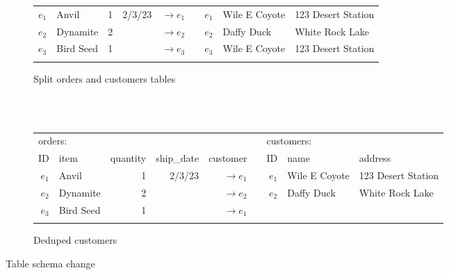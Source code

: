 \documentclass[english,submission]{programming}
\theoremstyle{definition}
\providecommand{\DIFdelbegin}{} %
\providecommand{\DIFaddbeginFL}{} %
\providecommand{\DIFaddendFL}{} %
\begin{document}
\begin{figure}
\begin{subfigure}[b]{40em}
\begin{tabular}{ r|l|r|r|r|cr|l|l|}
     $e_1$ & Anvil & 1 & 2/3/23 & $\rightarrow\!e_1$ && $e_1$ & Wile E Coyote & 123 Desert Station \\
     \hhline{~----~~--}
     $e_2$ & Dynamite & 2 & & $\rightarrow\!e_2$ && $e_2$ & Daffy Duck & White Rock Lake \\
     \hhline{~----~~--}
     $e_3$ & Bird Seed & 1 & & $\rightarrow\!e_3$ && $e_3$ & Wile E Coyote & 123 Desert Station \\
     \hhline{~----~~--}
  \end{tabular}
  \caption{Split orders and customers tables}
  \label{fig:tables-split}
\end{subfigure}
\\[-0.5em]~\\
\begin{subfigure}[b]{40em}\vspace{0pt}
  \sffamily
  \small
  \begin{tabular}{ r|l|r|r|r|cr|l|l|}
  \multicolumn{2}{l}{orders:}&\multicolumn{4}{l}{}&\multicolumn{2}{l}{customers:}\\
     \hhline{~----~~--}
     ID & item & quantity & ship\_date & customer && ID & name & address \\
     \hhline{~====~~==}

     $e_1$ & Anvil & 1 & 2/3/23 & $\rightarrow\!e_1$ && $e_1$ & Wile E Coyote & 123 Desert Station \\
     \hhline{~----~~--}
     $e_2$ & Dynamite & 2 & & $\rightarrow\!e_2$ && $e_2$ & Daffy Duck & White Rock Lake \\
     \hhline{~----~~--}
     $e_3$ & Bird Seed & 1 & & $\rightarrow\!e_1$ && \multicolumn{3}{l}{}$e_3$\\
     \hhline{~----~~~~}
  \end{tabular}
  \caption{Deduped customers}
  \label{fig:tables-dedup}
\end{subfigure}
\DIFaddbeginFL \vspace{-8pt}
\DIFaddendFL \caption{Table schema change}
\label{fig:tables}
\end{figure}


\DIFdelbegin %
\end{document}
